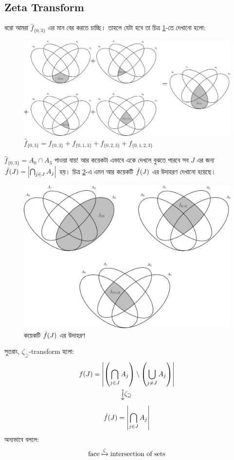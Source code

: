 \subsection{Zeta Transform}
ধরো আমরা $\hat{f}_{\{0,3\}}$ এর মান বের করতে চাচ্ছি। তাহলে যেটা হবে তা
চিত্র \ref{fhat_03_sum}-তে দেখানো হলো:
\begin{figure}[!ht]
  \centering
  \includegraphics[width=\textwidth]{./img/sos-dp/4set/fhat_03_sum.pdf}
  \caption{$\hat{f}_{\{0,3\}} = f_{\{0,3\}} + f_{\{0,1,3\}} +
  f_{\{0,2,3\}} + f_{\{0,1,2,3\}}$}
  \label{fhat_03_sum}
\end{figure}
$\hat{f}_{\{0,3\}} = A_0 \cap A_3$ পাওয়া যায়! আর কয়েকটা এভাবে একে দেখলে
বুঝতে পারবে সব $J$ এর জন্য $\hat{f}(J) = \left| \bigcap_{j \in J} A_j \right|$ হয়।
চিত্র \ref{three_fhat_example}-এ এমন আর কয়েকটি $\hat{f}(J)$ এর উদাহরণ
দেখানো হয়েছে।
\begin{figure}[!ht]
  \centering
  \includegraphics[width%
  =\textwidth]{./img/sos-dp/4set/three_fhat_example.pdf}
  \caption{কয়েকটি $\hat{f}(J)$ এর উদাহরণ}
  \label{three_fhat_example}
\end{figure}
সুতরাং, $\zeta_\supseteq$-transform হলো:
\begin{gather*}
  f\one{J} = \abs{ \pbra{\bigcap_{j \in J} A_j} \setminus
  \pbra{\bigcup_{j \ne J} A_j} }\\
  \rotatebox[origin = c]{-90}{$\xmapsto{\rotatebox[origin =
  c]{90}{$\zeta_\supseteq$}}$}\\
  \hat{f}\one{J} = \abs{ \bigcap_{j \in J} A_j }
\end{gather*}
অন্যভাবে বললে:
\[
  \text{face} \xmapsto{\zeta} \text{intersection of sets}
\]

